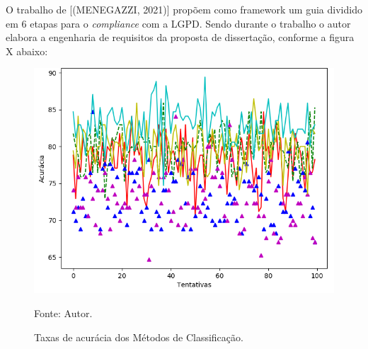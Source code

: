 \documentclass[
	12pt,				%
	openright,			%
	oneside,			%
	a4paper,			%
	english,			%
	french,				%
	spanish,			%
	brazil,				%
	]{abntex2}
\begin{document}
O trabalho de [(MENEGAZZI, 2021)] propõem como framework um guia dividido em 6 etapas para o \textit{compliance} com a LGPD. Sendo durante o trabalho o autor elabora a engenharia de requisitos da proposta de dissertação, conforme a figura X abaixo: 

\begin{figure}[ht]
    \centering
    \caption{Taxas de acurácia dos Métodos de Classificação.}
    \includegraphics[width=5.0in]{Images/acc-classification.png}
    \label{fig: grafico-acc}
    
    \centering \small Fonte: Autor.
\end{figure}
\end{document}
